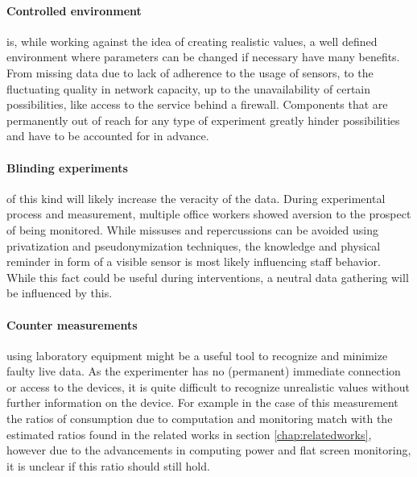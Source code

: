 \paragraph{Controlled environment}is, while working against the idea of creating realistic values, a well defined environment where parameters can be changed if necessary have many benefits. From missing data due to lack of adherence to the usage of sensors, to the fluctuating quality in network capacity, up to the unavailability of certain possibilities, like access to the service behind a firewall. Components that are permanently out of reach for any type of experiment greatly hinder possibilities and have to be accounted for in advance.

\paragraph{Blinding experiments}of this kind will likely increase the veracity of the data. During experimental process and measurement, multiple office workers showed aversion to the prospect of being monitored. While missuses and repercussions can be avoided using privatization and pseudonymization techniques, the knowledge and physical reminder in form of a visible sensor is most likely influencing staff behavior. While this fact could be useful during interventions, a neutral data gathering will be influenced by this.

\paragraph{Counter measurements}using laboratory equipment might be a useful tool to recognize and minimize faulty live data. As the experimenter has no (permanent) immediate connection or access to the devices, it is quite difficult to recognize unrealistic values without further information on the device. For example in the case of this measurement the ratios of consumption due to computation and monitoring match with the estimated ratios found in the related works in section \ref{chap:relatedworks}, however due to the advancements in computing power and flat screen monitoring, it is unclear if this ratio should still hold.

